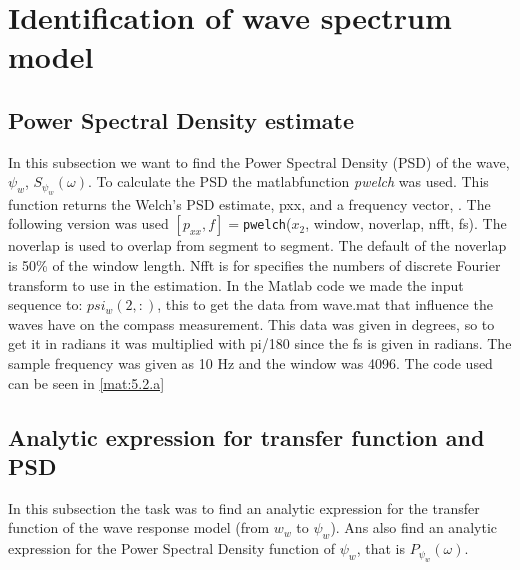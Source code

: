 
\section{Identification of wave spectrum model} \label{sec:part2}

\subsection{Power Spectral Density estimate}
In this subsection we want to find the Power Spectral Density (PSD) of the wave,$\psi_w$, $S_{\psi_w}(\omega)$. To calculate the PSD the matlabfunction \textit{pwelch} was used. This function returns the Welch's PSD estimate, pxx, and a frequency vector, \cite{pwelch}.
\newline 
The following version was used $[p_{xx} , f] =  $\texttt{pwelch}($x_2$, window, noverlap, nfft, fs). The noverlap is used to overlap from segment to segment. The default of the noverlap is 50\% of the window length. Nfft is for specifies the numbers of discrete Fourier transform to use in the estimation. In the Matlab code we made the input sequence to: $psi_w(2,:)$, this to get the data from wave.mat that influence the waves have on the compass measurement. This data was given in degrees, so to get it in radians it was multiplied with pi/180  since the fs is given in radians. The sample frequency was given as 10 Hz and the window was 4096. The code used can be seen in \cref{mat:5.2.a}

\subsection{Analytic expression for transfer function and PSD}
In this subsection the task was to find an analytic expression for the transfer function of the wave response model (from $w_w$ to $\psi_w$). Ans also find an analytic expression for the Power Spectral Density function of $\psi_w$, that is $P_{\psi_w}(\omega)$.

